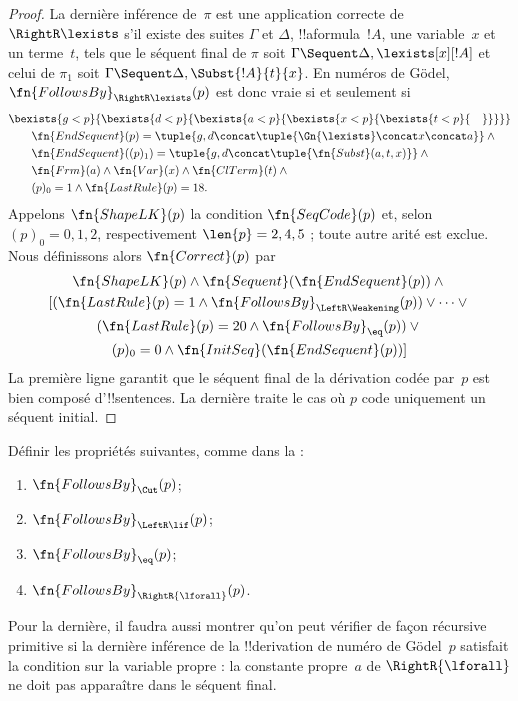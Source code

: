 \documentclass[../../../include/open-logic-section]{subfiles}
\begin{document}
\begin{proof}
La dernière inférence de~$\pi$ est une application correcte de
$\RightR\lexists$ s'il existe des suites $\Gamma$ et $\Delta$,
!!a{formula}~$!A$, une variable~$x$ et un terme~$t$, tels que
le séquent final de $\pi$ soit
$\Gamma \Sequent \Delta, \lexists[x][!A]$ et celui de $\pi_1$
soit $\Gamma \Sequent \Delta, \Subst{!A}{t}{x}$. En numéros de
G\"odel, $\fn{FollowsBy}_{\RightR\lexists}(p)$ est donc vraie si et
seulement si
\begin{align*}
  & \bexists{g<p}{\bexists{d<p}{\bexists{a<p}{\bexists{x<p}{\bexists{t<p}{\quad}}}}}\\
  & \qquad \fn{EndSequent}(p) =
  \tuple{
    g,
    d \concat \tuple{\Gn{\lexists} \concat x \concat a}
  } \land {}\\
  & \qquad \fn{EndSequent}((p)_1) =
  \tuple{
    g,
    d \concat \tuple{\fn{Subst}(a, t, x)}
  } \land {}\\
  & \qquad \fn{Frm}(a)\land\fn{Var}(x)\land\fn{ClTerm}(t)\land{}\\ & \qquad (p)_0 = 1 \land \fn{LastRule}(p) = 18.
\end{align*}
Appelons $\fn{ShapeLK}(p)$ la condition $\fn{SeqCode}(p)$ et, selon $(p)_0=0,1,2$, respectivement $\len{p}=2,4,5$ ; toute autre arité est exclue. Nous définissons alors $\fn{Correct}(p)$ par
\begin{multline*}
  \fn{ShapeLK}(p)\land\fn{Sequent}(\fn{EndSequent}(p)) \land {}\\
  [(\fn{LastRule}(p) = 1 \land
  \fn{FollowsBy}_{\LeftR\Weakening}(p)) \lor \dots \lor {}\\
  (\fn{LastRule}(p) = 20 \land \fn{FollowsBy}_{\eq}(p)) \lor {}\\
  (p)_0 = 0 \land \fn{InitSeq}(\fn{EndSequent}(p))]
\end{multline*}
La première ligne garantit que le séquent final de la dérivation
codée par~$p$ est bien composé d'!!{sentence}s. La dernière traite
le cas où $p$ code uniquement un séquent initial.
\end{proof}

\begin{prob}
  Définir les propriétés suivantes, comme dans la
   :
  \begin{enumerate}
  \item $\fn{FollowsBy}_{\Cut}(p)$;
  \item $\fn{FollowsBy}_{\LeftR\lif}(p)$;
  \item $\fn{FollowsBy}_{\eq}(p)$;
  \item $\fn{FollowsBy}_{\RightR{\lforall}}(p)$.
  \end{enumerate}
  Pour la dernière, il faudra aussi montrer qu'on peut vérifier de
  façon récursive primitive si la dernière inférence de la
  !!{derivation} de numéro de G\"odel~$p$ satisfait la condition sur
  la variable propre : la constante propre~$a$ de
  $\RightR{\lforall}$ ne doit pas apparaître dans le séquent final.
\end{prob}
\end{document}
